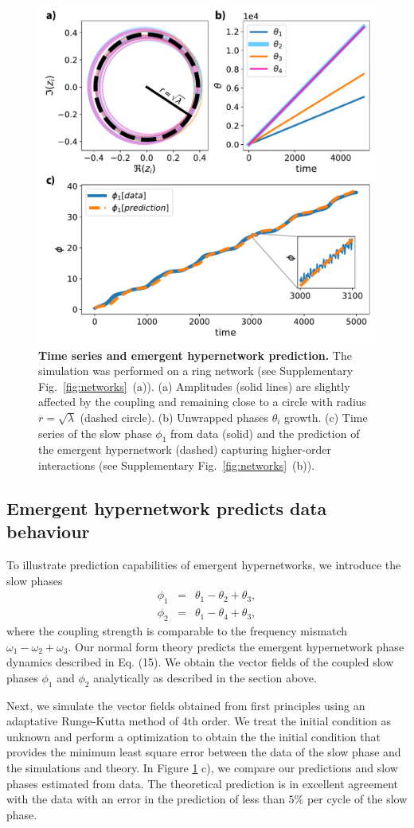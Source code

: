 \documentclass[12pt]{article}
\theoremstyle{plain}
\theoremstyle{definition}
\theoremstyle{remark}
\theoremstyle{remark}
\begin{document}
\begin{figure}[h]
 \centering
    \includegraphics[width=0.5\columnwidth]{4nodes_new_v6.pdf}
    \caption{{\bf Time series and  emergent hypernetwork prediction.} The simulation was performed on a ring network (see Supplementary Fig.~\ref{fig:networks}~(a)). (a)   Amplitudes (solid lines) are slightly affected by the coupling and remaining close to a circle with radius $r = \sqrt{\lambda}$ (dashed circle). (b) Unwrapped phases $\theta_i$ growth. (c) Time series of the slow phase $\phi_1$ from data (solid) and the prediction of the emergent hypernetwork (dashed) capturing higher-order interactions  (see Supplementary Fig.~\ref{fig:networks}~(b)).
}
    \label{fig:4nodes_phi_1}
\end{figure}


\subsection{Emergent hypernetwork predicts data behaviour}
To illustrate prediction capabilities of emergent hypernetworks, we introduce the slow phases 
\begin{eqnarray}\label{slow_phases}
\phi_1 &=& \theta_1  - \theta_2 + \theta_3,\\ \nonumber
\phi_2 &=& \theta_1 - \theta_4 + \theta_3,
\end{eqnarray}
where the coupling strength is comparable to the frequency mismatch $\omega_1 - \omega_2 + \omega_3$. Our normal form theory predicts the emergent hypernetwork phase dynamics described in Eq. (15).   
We obtain the vector fields  of the coupled slow phases $\phi_1$ and $\phi_2$  analytically as described in the section above. 

Next, we simulate the vector fields obtained from first principles  using an adaptative Runge-Kutta method of 4th order. We treat the initial condition as unknown and perform a optimization to obtain the the initial condition that provides the minimum least square error between the data of the slow phase and the simulations and theory.  In Figure \ref{fig:4nodes_phi_1} c), we compare our predictions and slow phases estimated from data.
The theoretical prediction is in excellent agreement with the data with an error in the prediction of less than $5\%$ per cycle of the slow phase. 
\end{document}
